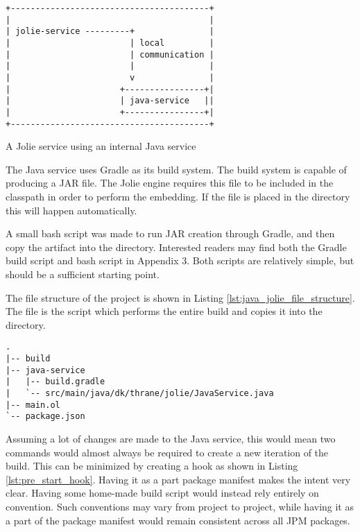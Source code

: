 \begin{listing}[H]
\begin{verbatim}
+----------------------------------------+
|                                        |
| jolie-service ---------+               |
|                        | local         |
|                        | communication |
|                        |               |
|                        v               |
|                      +----------------+|
|                      | java-service   ||
|                      +----------------+|
+----------------------------------------+
\end{verbatim}
\caption{A Jolie service using an internal Java service}
\label{fig:jolie_java_service}
\end{listing}

The Java service uses Gradle as its build system. The build system is capable
of producing a JAR file. The Jolie engine requires this file to be included in
the classpath in order to perform the embedding. If the file is placed in the
 directory this will happen automatically.

A small bash script was made to run JAR creation through Gradle, and then copy
the artifact into the  directory. Interested readers may find both
the Gradle build script and bash script in Appendix 3. Both scripts are
relatively simple, but should be a sufficient starting point.

The file structure of the project is shown in Listing
\ref{lst:java_jolie_file_structure}. The  file is the script which
performs the entire build and copies it into the  directory.

\begin{listing}[H]
\begin{verbatim}
.
|-- build
|-- java-service
|   |-- build.gradle
|   `-- src/main/java/dk/thrane/jolie/JavaService.java
|-- main.ol
`-- package.json
\end{verbatim}
\caption{}
\label{lst:java_jolie_file_structure}
\end{listing}

Assuming a lot of changes are made to the Java service, this would mean two
commands would almost always be required to create a new iteration of the
build. This can be minimized by creating a  hook as shown in
Listing \ref{lst:pre_start_hook}. Having it as a part package manifest makes
the intent very clear. Having some home-made build script would instead rely
entirely on convention. Such conventions may vary from project to project,
while having it as a part of the package manifest would remain consistent
across all JPM packages.

